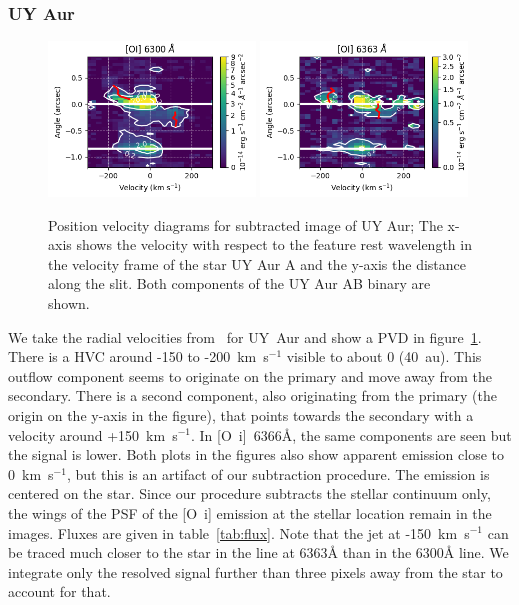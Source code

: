 \documentclass[twocolumn,trackchanges]{aastex62}
\begin{document}
\subsubsection{UY Aur}
\begin{figure}[h!]
\begin{center}
\includegraphics[width=0.49\textwidth]{UY_Aur_6300.png}
\includegraphics[width=0.49\textwidth]{UY_Aur_6363.png}
\caption{Position velocity diagrams for subtracted
image of UY Aur; The x-axis shows the velocity with respect to the
feature rest wavelength in the velocity frame of the star UY Aur
A and the y-axis the distance along the slit. Both components of the UY Aur AB binary are shown.
\label{fig:UYAur}
}
\end{center}
\end{figure}
We take the radial velocities from~\citet{2012ApJ...745..119N} for UY~Aur and
show a PVD in figure~\ref{fig:UYAur}. There is a HVC around -150 to
-200~km~s$^{-1}$ visible to about 0 (40~au). This outflow component
seems to originate on the primary and move away from the secondary. There is a
second component, also originating from the primary (the origin on the y-axis in
the figure), that points towards the secondary with a velocity around
+150~km~s$^{-1}$. In [O~{\sc i}]~6366\AA{}, the same components are seen but
the signal is lower. Both plots in the figures also show apparent emission close to
0~km~s$^{-1}$, but this is an artifact of our subtraction procedure. The
emission is centered on the star. Since our procedure subtracts the stellar
continuum only, the wings of the PSF of the [O~{\sc i}] emission at the stellar
location remain in the images. Fluxes are given in table~\ref{tab:flux}. Note
that the jet at -150~km~s$^{-1}$ can be traced much closer to the star in the
line at 6363\AA{} than in the 6300\AA{} line. We integrate only the resolved  signal further than three pixels away from the star to account for that.
\end{document}

